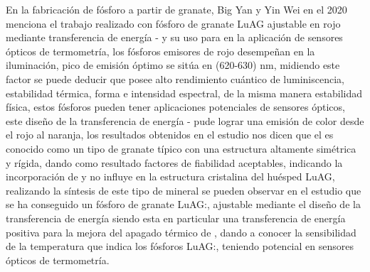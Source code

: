 En la fabricación de fósforo  a partir de granate, Big Yan y
Yin Wei en el 2020  menciona  el trabajo realizado con fósforo de granate LuAG
ajustable en rojo mediante transferencia de energía  -
 y su uso para  en la aplicación de sensores ópticos de
termometría, los fósforos emisores de rojo desempeñan en la iluminación, pico
de emisión óptimo se sitúa en (620-630) nm, midiendo este factor se puede deducir
que posee alto rendimiento cuántico de luminiscencia, estabilidad térmica,
forma e intensidad espectral, de la misma manera estabilidad física, estos
fósforos  pueden tener aplicaciones  potenciales de sensores ópticos, este
diseño de  la transferencia  de energía - pude lograr
una emisión  de color desde el rojo al naranja, los resultados obtenidos en el
estudio nos dicen que el  es conocido como un tipo de granate
típico con una estructura altamente simétrica y rígida, dando como resultado
factores de fiabilidad aceptables, indicando la incorporación de  y
 no influye en la estructura cristalina del huésped LuAG,
realizando la síntesis de este tipo de mineral se pueden observar en el estudio
que  se ha conseguido un fósforo  de granate LuAG:, 
ajustable mediante el diseño de la transferencia de energía 
 siendo esta en particular  una transferencia de energía positiva
para la mejora del apagado térmico de , dando a conocer la
sensibilidad de la temperatura que indica los fósforos LuAG:,
 teniendo potencial en sensores ópticos  de
termometría\cite{Yan2021}.\\

